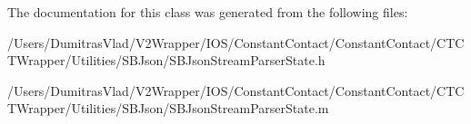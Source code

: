 The documentation for this class was generated from the following files\-:\begin{DoxyCompactItemize}
\item 
/\-Users/\-Dumitras\-Vlad/\-V2\-Wrapper/\-I\-O\-S/\-Constant\-Contact/\-Constant\-Contact/\-C\-T\-C\-T\-Wrapper/\-Utilities/\-S\-B\-Json/S\-B\-Json\-Stream\-Parser\-State.\-h\item 
/\-Users/\-Dumitras\-Vlad/\-V2\-Wrapper/\-I\-O\-S/\-Constant\-Contact/\-Constant\-Contact/\-C\-T\-C\-T\-Wrapper/\-Utilities/\-S\-B\-Json/S\-B\-Json\-Stream\-Parser\-State.\-m\end{DoxyCompactItemize}
